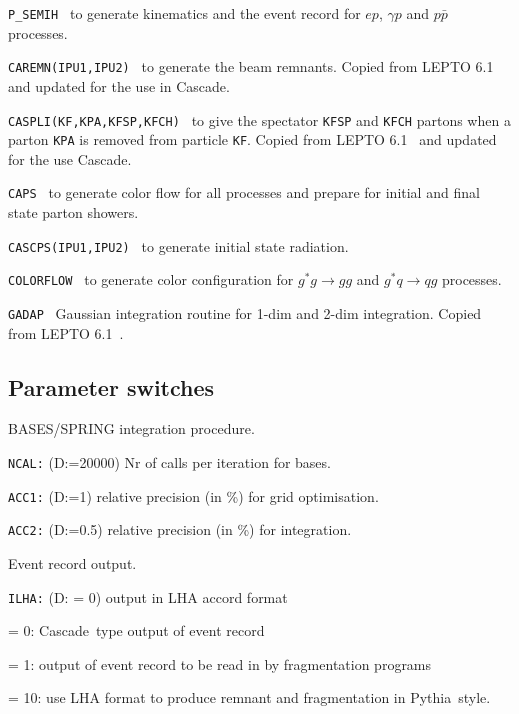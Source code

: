\documentclass[11pt]{article} \usepackage{mystyle-new}
\newcommand{\deflab}[1]{#1\hfil}%
\newenvironment{defl}[1]%
  {\begin{list}{}{\settowidth{\labelwidth}{#1}%
  \setlength{\leftmargin}{\labelwidth}%
  \addtolength{\leftmargin}{\labelsep}%
  \setlength{\itemsep}{0pt plus 1pt}
  \setlength{\parsep}{0pt plus 1pt}
  \setlength{\topsep}{0pt plus 1pt}
  \setlength{\partopsep}{0pt plus 1pt}
  \setlength{\parskip}{2mm plus 1mm minus 1mm}
  \let\makelabel\deflab}}%
  {\end{list}}
\newcommand{\LEPTOMC}{Ingelman_LEPTO65}
\def\CASCADE{{\sc Cascade}}
\def\PYTHIA{{\sc Pythia}}
\begin{document}
\begin{defl}{123456789012345}
\item[{\tt P\_SEMIH }] 
         to generate kinematics and the 
         event record for $ep$, $\gamma p$ and $p\bar{p}$
         processes.
\item[{\tt CAREMN(IPU1,IPU2) }]   
         to generate the beam remnants.
            Copied from LEPTO 6.1~\cite{\LEPTOMC} and updated for
            the use in \CASCADE . 
\item[{\tt CASPLI(KF,KPA,KFSP,KFCH) }]   
            to give the spectator \verb"KFSP" and \verb"KFCH"
            partons when a parton
            \verb"KPA" is removed from particle \verb"KF".
            Copied from LEPTO 6.1~\cite{\LEPTOMC} and updated for
            the use \CASCADE. 
\item[{\tt CAPS }]   
  to generate color flow  for all
            processes and prepare for initial and final state
            parton showers.
\item[{\tt CASCPS(IPU1,IPU2) }]   to generate initial state radiation.
\item[{\tt COLORFLOW }]   to generate color configuration for $g^*g \to gg$ and $g^*q
            \to qg$ processes.
\item[{\tt GADAP }]   Gaussian integration routine for 1-dim and 
            2-dim integration.
            Copied from LEPTO 6.1~\cite{\LEPTOMC}.
\end{defl}


\subsection{Parameter switches}
\begin{defl}{123456789012345}
\item[]   BASES/SPRING integration procedure.
\item[{\tt NCAL:}]  (D:=20000) Nr of calls per iteration for bases.
\item[{\tt ACC1:}]  (D:=1)    relative precision (in \%) for grid optimisation.
\item[{\tt ACC2:}]  (D:=0.5)  relative precision (in \%) for integration.
\item[]   Event record output.
\item[{\tt ILHA:}]  (D: = 0) output in LHA accord \cite{lhaaccord} format
\item[ ]  = 0: \CASCADE\ type output of event record
\item[ ]  = 1: output of event record to be read in by fragmentation programs	
\item[ ]  = 10:  use LHA format to produce remnant and fragmentation in \PYTHIA\ style.	

\end{defl}
\end{document}
